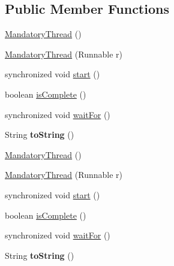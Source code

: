 \subsection*{Public Member Functions}
\begin{DoxyCompactItemize}
\item 
\hyperlink{class_c_a_s_u_a_l_1_1misc_1_1_mandatory_thread_a09160140c6e91ea2c5a14c264bc1fd85}{Mandatory\-Thread} ()
\item 
\hyperlink{class_c_a_s_u_a_l_1_1misc_1_1_mandatory_thread_ae74d0a4c148aa703b830d0890d666a7e}{Mandatory\-Thread} (Runnable r)
\item 
synchronized void \hyperlink{class_c_a_s_u_a_l_1_1misc_1_1_mandatory_thread_af99f45ee5d20c969c1d3edd167b334c7}{start} ()
\item 
boolean \hyperlink{class_c_a_s_u_a_l_1_1misc_1_1_mandatory_thread_af4c81c91c1927ed0f4fcab504ab2fe47}{is\-Complete} ()
\item 
synchronized void \hyperlink{class_c_a_s_u_a_l_1_1misc_1_1_mandatory_thread_a73dba51691a5c7a34fc584213e3a2121}{wait\-For} ()
\item 
\hypertarget{class_c_a_s_u_a_l_1_1misc_1_1_mandatory_thread_a2a1f50d1bf07880d18a77b086aacf000}{String {\bfseries to\-String} ()}\label{class_c_a_s_u_a_l_1_1misc_1_1_mandatory_thread_a2a1f50d1bf07880d18a77b086aacf000}

\item 
\hyperlink{class_c_a_s_u_a_l_1_1misc_1_1_mandatory_thread_a09160140c6e91ea2c5a14c264bc1fd85}{Mandatory\-Thread} ()
\item 
\hyperlink{class_c_a_s_u_a_l_1_1misc_1_1_mandatory_thread_ae74d0a4c148aa703b830d0890d666a7e}{Mandatory\-Thread} (Runnable r)
\item 
synchronized void \hyperlink{class_c_a_s_u_a_l_1_1misc_1_1_mandatory_thread_af99f45ee5d20c969c1d3edd167b334c7}{start} ()
\item 
boolean \hyperlink{class_c_a_s_u_a_l_1_1misc_1_1_mandatory_thread_af4c81c91c1927ed0f4fcab504ab2fe47}{is\-Complete} ()
\item 
synchronized void \hyperlink{class_c_a_s_u_a_l_1_1misc_1_1_mandatory_thread_a73dba51691a5c7a34fc584213e3a2121}{wait\-For} ()
\item 
\hypertarget{class_c_a_s_u_a_l_1_1misc_1_1_mandatory_thread_a2a1f50d1bf07880d18a77b086aacf000}{String {\bfseries to\-String} ()}\label{class_c_a_s_u_a_l_1_1misc_1_1_mandatory_thread_a2a1f50d1bf07880d18a77b086aacf000}

\end{DoxyCompactItemize}


